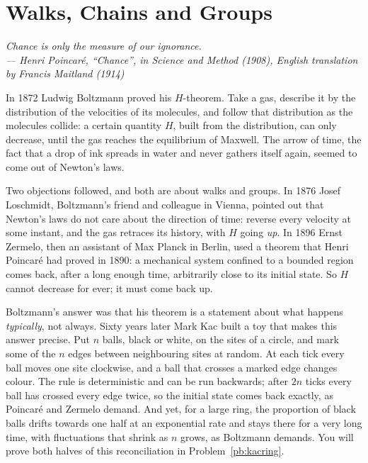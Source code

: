 \chapter{Walks, Chains and Groups}

\begin{center}\itshape
Chance is only the measure of our ignorance.\\
\upshape --- Henri Poincaré, ``Chance'', in \emph{Science and Method} (1908), English translation by Francis Maitland (1914)
\end{center}

In 1872 Ludwig Boltzmann proved his $H$-theorem. Take a gas, describe it by the distribution of the velocities of its molecules, and
follow that distribution as the molecules collide: a certain quantity $H$, built from the distribution, can only decrease, until the
gas reaches the equilibrium of Maxwell. The arrow of time, the fact that a drop of ink spreads in water and never gathers itself
again, seemed to come out of Newton's laws.

Two objections followed, and both are about walks and groups. In 1876 Josef Loschmidt, Boltzmann's friend and colleague in Vienna,
pointed out that Newton's laws do not care about the direction of time: reverse every velocity at some instant, and the gas
retraces its history, with $H$ going \emph{up}. In 1896 Ernst Zermelo, then an assistant of Max Planck in Berlin, used a theorem that
Henri Poincaré had proved in 1890: a mechanical system confined to a bounded region comes back, after a long enough time,
arbitrarily close to its initial state. So $H$ cannot decrease for ever; it must come back up.

Boltzmann's answer was that his theorem is a statement about what happens \emph{typically}, not always. Sixty years later Mark Kac
built a toy that makes this answer precise. Put $n$ balls, black or white, on the sites of a circle, and mark some of the $n$ edges
between neighbouring sites at random. At each tick every ball moves one site clockwise, and a ball that crosses a marked edge changes
colour. The rule is deterministic and can be run backwards; after $2n$ ticks every ball has crossed every edge twice, so the
initial state comes back exactly, as Poincaré and Zermelo demand. And yet, for a large ring, the proportion of black balls drifts
towards one half at an exponential rate and stays there for a very long time, with fluctuations that shrink as $n$ grows, as
Boltzmann demands. You will prove both halves of this reconciliation in Problem~\ref{pb:kacring}.

